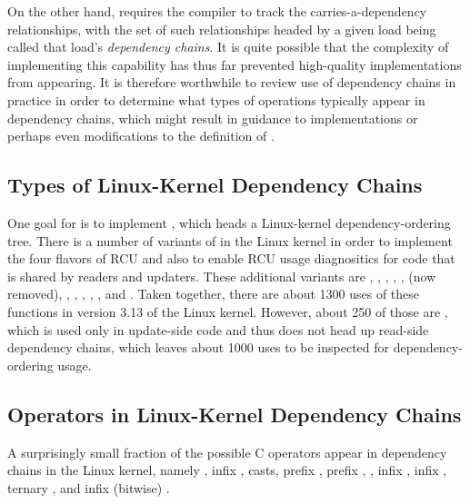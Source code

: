 \documentclass[letterpaper,twocolumn,10pt]{article}
\begin{document}
On the other hand,  requires the compiler
to track the carries-a-dependency relationships, with the
set of such relationships headed by a given 
load being called that load's \emph{dependency chains}.
It is quite possible that the complexity of implementing this
capability has thus far prevented high-quality 
implementations from appearing.
It is therefore worthwhile to review use of dependency chains in
practice in order to determine what types of operations typically
appear in dependency chains, which might result in guidance to
implementations or perhaps even modifications to the definition of
.

\subsection{Types of Linux-Kernel Dependency Chains}
\label{sec:Types of Linux-Kernel Dependency Chains}

One goal for  is to implement
, which heads a Linux-kernel dependency-ordering tree.
There is a number of variants of  in the
Linux kernel in order to implement the four flavors of RCU and also to enable
RCU usage diagnositics for code that is shared by readers and updaters.
These additional variants are
,
,
,
,
,
 (now removed),
,
,
, 
,
, and
.
Taken together, there are about 1300 uses of these functions in version 3.13
of the Linux kernel.
However, about 250 of those are , which
is used only in update-side code and thus does not head up read-side
dependency chains, which leaves about 1000 uses to be inspected for
dependency-ordering usage.

\subsection{Operators in Linux-Kernel Dependency Chains}
\label{sec:Operators in Linux-Kernel Dependency Chains}

A surprisingly small fraction of the possible C operators appear in
dependency chains in the Linux kernel, namely
\co{->}, infix \co{=}, casts, prefix \co{&}, prefix \co{*}, \co{[]},
infix \co{+}, infix \co{-}, ternary , and infix (bitwise) \co{&}.
\end{document}
